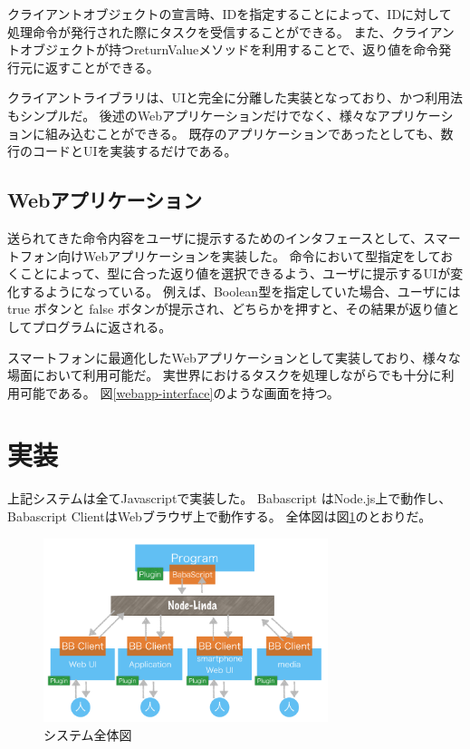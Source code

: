 \documentclass[twoside]{wiss}
\begin{document}
クライアントオブジェクトの宣言時、IDを指定することによって、IDに対して処理命令が発行された際にタスクを受信することができる。
また、クライアントオブジェクトが持つreturnValueメソッドを利用することで、返り値を命令発行元に返すことができる。

クライアントライブラリは、UIと完全に分離した実装となっており、かつ利用法もシンプルだ。
後述のWebアプリケーションだけでなく、様々なアプリケーションに組み込むことができる。
既存のアプリケーションであったとしても、数行のコードとUIを実装するだけである。

\subsection{Webアプリケーション}

送られてきた命令内容をユーザに提示するためのインタフェースとして、スマートフォン向けWebアプリケーションを実装した。
命令において型指定をしておくことによって、型に合った返り値を選択できるよう、ユーザに提示するUIが変化するようになっている。
例えば、Boolean型を指定していた場合、ユーザには true ボタンと false ボタンが提示され、どちらかを押すと、その結果が返り値としてプログラムに返される。

スマートフォンに最適化したWebアプリケーションとして実装しており、様々な場面において利用可能だ。
実世界におけるタスクを処理しながらでも十分に利用可能である。
図\ref{webapp-interface}のような画面を持つ。

\section{実装}

上記システムは全てJavascriptで実装した。
Babascript はNode.js上で動作し、Babascript ClientはWebブラウザ上で動作する。
全体図は図\ref{system}のとおりだ。

\begin{figure}[h]
  \includegraphics[width=83mm, bb=0 0 928 599]{./images/system.png}
  \caption{システム全体図}  
  \label{system}
\end{figure}
\end{document}
